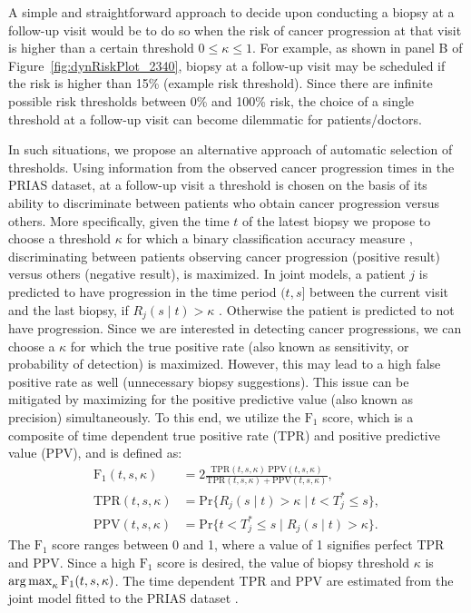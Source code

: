 A simple and straightforward approach to decide upon conducting a biopsy at a follow-up visit would be to do so when the risk of cancer progression at that visit is higher than a certain threshold $0 \leq \kappa \leq 1$. For example, as shown in panel B of Figure~\ref{fig:dynRiskPlot_2340}, biopsy at a follow-up visit may be scheduled if the risk is higher than 15\% (example risk threshold). Since there are infinite possible risk thresholds between 0\% and 100\% risk, the choice of a single threshold at a follow-up visit can become dilemmatic for patients/doctors.

In such situations, we propose an alternative approach of automatic selection of thresholds. Using information from the observed cancer progression times in the PRIAS dataset, at a follow-up visit a threshold is chosen on the basis of its ability to discriminate between patients who obtain cancer progression versus others. More specifically, given the time $t$ of the latest biopsy we propose to choose a threshold $\kappa$ for which a binary classification accuracy measure \citep{lopez2014optimalcutpoints}, discriminating between patients observing cancer progression (positive result) versus others (negative result), is maximized. In joint models, a patient $j$ is predicted to have progression in the time period $(t, s]$ between the current visit and the last biopsy, if ${R_j(s \mid t) > \kappa}$ \cite{rizopoulosJMbayes, landmarking2017}. Otherwise the patient is predicted to not have progression. Since we are interested in detecting cancer progressions, we can choose a $\kappa$ for which the true positive rate (also known as sensitivity, or probability of detection) is maximized. However, this may lead to a high false positive rate as well (unnecessary biopsy suggestions). This issue can be mitigated by maximizing for the positive predictive value (also known as precision) simultaneously. To this end, we utilize the $\mbox{F}_1$ score, which is a composite of time dependent true positive rate (TPR) and positive predictive value (PPV), and is defined as:
\begin{equation}
\label{eq:F1_TPR_PPV}
\begin{split}
\mbox{F}_1(t,  s, \kappa) &= 2\frac{\mbox{TPR}(t,  s, \kappa)\ \mbox{PPV}(t,  s, \kappa)}{\mbox{TPR}(t,  s, \kappa) + \mbox{PPV}(t,  s, \kappa)},\\
\mbox{TPR}(t,  s, \kappa) &= \mbox{Pr}\big\{R_j(s \mid t) > \kappa \mid t < T^*_j \leq s\big\},\\
\mbox{PPV}(t,  s, \kappa) &= \mbox{Pr}\big\{t < T^*_j \leq s \mid R_j(s \mid t) > \kappa \big\}.
\end{split}
\end{equation}
The $\mbox{F}_1$ score ranges between 0 and 1, where a value of 1 signifies perfect TPR and PPV. Since a high $\mbox{F}_1$ score is desired, the value of biopsy threshold $\kappa$ is $\operatorname{arg\,max}_{\kappa} \mbox{F}_1(t, s, \kappa)$. The time dependent TPR and PPV are estimated from the joint model fitted to the PRIAS dataset \cite{landmarking2017}.

